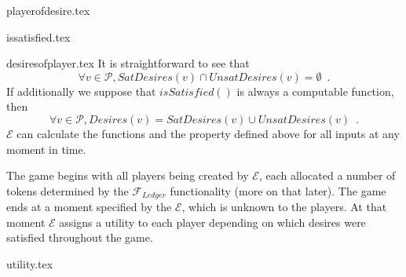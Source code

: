   {playerofdesire.tex}

  {issatisfied.tex}

  {desiresofplayer.tex}
  It is straightforward to see that
  \begin{equation*}
    \forall v \in \mathcal{P}, SatDesires\left(v\right) \cap UnsatDesires\left(v\right) =
    \emptyset \enspace.
  \end{equation*}
  If additionally we suppose that $isSatisfied\left(\right)$ is always a computable
  function, then
  \begin{equation*}
    \forall v \in \mathcal{P}, Desires\left(v\right) = SatDesires\left(v\right) \cup
    UnsatDesires\left(v\right) \enspace.
  \end{equation*}
  $\mathcal{E}$ can calculate the functions and the property defined above for all inputs
  at any moment in time.

  The game begins with all players being created by $\mathcal{E}$, each allocated a number
  of tokens determined by the $\mathcal{F}_{Ledger}$ functionality (more on that later).
  The game ends at a moment specified by the $\mathcal{E}$, which is unknown to the
  players. At that moment $\mathcal{E}$ assigns a utility to each player depending on
  which desires were satisfied throughout the game.

  {utility.tex}
